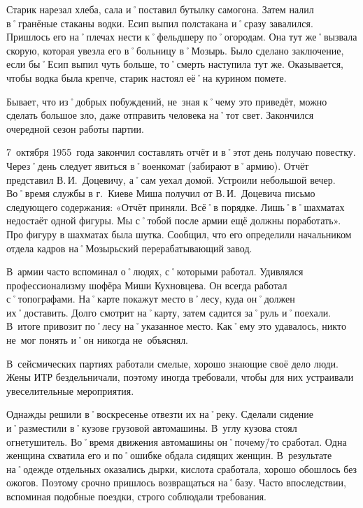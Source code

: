 Старик нарезал хлеба, сала и˚поставил бутылку самогона. Затем налил в˚гранёные стаканы водки. Есип выпил полстакана и˚сразу завалился. Пришлось его на˚плечах нести к˚фельдшеру по˚огородам. Она тут же˚вызвала скорую, которая увезла его в˚больницу в˚Мозырь. Было сделано заключение, если бы˚Есип выпил чуть больше, то˚смерть наступила тут же. Оказывается, чтобы водка была крепче, старик настоял её˚на курином помете.

Бывает, что из˚добрых побуждений, не~зная к˚чему это приведёт, можно сделать большое зло, даже отправить человека на˚тот свет. Закончился очередной сезон работы партии.

7~октября 1955~года закончил составлять отчёт и в˚этот день получаю повестку. Через˚день следует явиться в˚военкомат (забирают в˚армию). Отчёт представил В.\,И.~Доцевичу, а˚сам уехал домой. Устроили небольшой вечер. Во˚время службы в г.~Киеве Миша получил от В.\,И.~Доцевича письмо следующего содержания: «Отчёт приняли. Всё˚в порядке. Лишь˚в˚шахматах недостаёт одной фигуры. Мы с˚тобой после армии ещё должны поработать». Про фигуру в шахматах была шутка. Сообщил, что его определили начальником отдела кадров на˚Мозырьский перерабатывающий завод.

В~армии часто вспоминал о˚людях, с˚которыми работал. Удивлялся профессионализму шофёра Миши Кухновцева. Он всегда работал с˚топографами. На˚карте покажут место в˚лесу, куда он˚должен их˚доставить. Долго смотрит на˚карту, затем садится за˚руль и˚поехали. В~итоге привозит по˚лесу на˚указанное место. Как˚ему это удавалось, никто не~мог понять и˚он никогда не~объяснял.

В~сейсмических партиях работали смелые, хорошо знающие своё дело люди. Жены ИТР бездельничали, поэтому иногда требовали, чтобы для них устраивали увеселительные мероприятия.

Однажды решили в˚воскресенье отвезти их на˚реку. Сделали сидение и˚разместили в˚кузове грузовой автомашины. В~углу кузова стоял огнетушитель. Во˚время движения автомашины он˚почему\=/то сработал. Одна женщина схватила его и по˚ошибке обдала сидящих женщин. В~результате на˚одежде отдельных оказались дырки, кислота сработала, хорошо обошлось без ожогов. Поэтому срочно пришлось возвращаться на˚базу. Часто впоследствии, вспоминая подобные поездки, строго соблюдали требования.